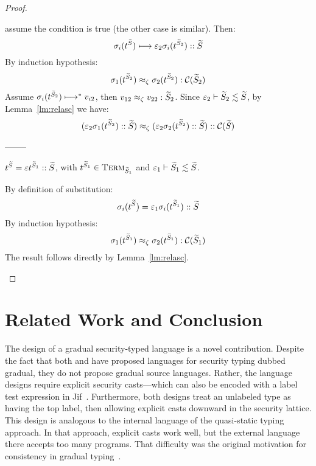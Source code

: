 \documentclass[authoryear,sort&compress,9pt,twocolumn,nocopyrightspace]{sigplanconf}
\newcommand{\oblset}[1]{\textsc{#1}}
\newcommand{\csub}{\lesssim}
\newcommand{\?}{\textsf{\upshape ?}} \newcommand{\consistent}[1]{\widetilde{#1}}
\newcommand{\TermT}[1]{\oblset{Term}_{#1}}
\newcommand{\cast}[2]{\evcast{\evpr{#1}}{#2}}
\newcommand{\red}{\longmapsto}
\newcommand{\ev}{\varepsilon}
\newcommand{\evcast}[2]{#1#2}
\newcommand{\evpr}[1]{\braket{#1}}
\newcommand{\lobs}{\zeta}
\newcommand{\rel}{\approx_{\lobs}}
\newcommand{\rcomp}[1]{\mathcal{C}(#1)}
\newcommand{\subst}{\sigma}
\newcommand{\itm}[1]{{t^{\cS_{#1}}}}
\renewcommand{\cast}[2]{#1#2}
\begin{document}
\begin{proof}
\begin{case}[\textsf{if}]
assume the condition is true (the other case is similar). Then:
\begin{displaymath}
\subst_i(\itm{}) \red \cast{\ev_2}{\subst_i(\itm{2}) :: \cS}
\end{displaymath}
By induction hypothesis:
\begin{displaymath}
\subst_1(\itm{2}) \rel \subst_2(\itm{2}) : \rcomp{\cS_2}
\end{displaymath}
Assume $\subst_i(\itm{2}) \red^{*} v_{i2}$, then $v_{12} \rel v_{22} :
\cS_2$. Since $\ev_2 |- \cS_2 \csub \cS$, by Lemma~\ref{lm:relasc} we have:
\begin{displaymath}
(\cast{\ev_2}{\subst_1(\itm{2}) :: \cS}) \rel
(\cast{\ev_2}{\subst_2(\itm{2}) :: \cS}) :: \rcomp{\cS}
\end{displaymath}
\end{case}

\begin{center}--------\end{center}
\begin{case}[::]
$\itm{} = \cast{\ev}\itm{1}::\cS$, with $\itm{1} \in \TermT{\cS_1}$
and $\ev_1 |- \cS_1 \csub \cS$. 

\noindent By definition of substitution:
\begin{displaymath}
\subst_i(\itm{}) = \cast{\ev_1}\subst_i(\itm{1})::\cS
\end{displaymath}
By induction hypothesis:
\begin{displaymath}
\subst_1(\itm{1}) \rel \subst_2(\itm{1}) : \rcomp{\cS_1}
\end{displaymath}
The result follows directly by Lemma~\ref{lm:relasc}.



\end{case}
\end{proof}

\section{Related Work and Conclusion}

The design of a gradual security-typed language is a novel
contribution. Despite the fact that both \citet{disney11flow} and
\citet{fennellThiemann:csf2013} have proposed languages for security
typing dubbed gradual, they do not propose gradual source languages.
Rather, the language designs require explicit security casts---which
can also be encoded with a label test expression in
Jif~\cite{zhengMyers:ijis2007}.
Furthermore, both designs treat an unlabeled type as having the top label, then
allowing explicit casts downward in the security lattice.  This design is
analogous to the internal language of the quasi-static typing approach.  In
that approach, explicit casts work well, but the external language there
accepts too many programs.  That difficulty was the original motivation for
consistency in gradual typing~\cite{GradualTyping}.
\end{document}

